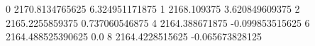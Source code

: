 0 2170.8134765625 6.324951171875
1 2168.109375 3.620849609375
2 2165.2255859375 0.737060546875
4 2164.388671875 -0.099853515625
6 2164.488525390625 0.0
8 2164.4228515625 -0.065673828125
